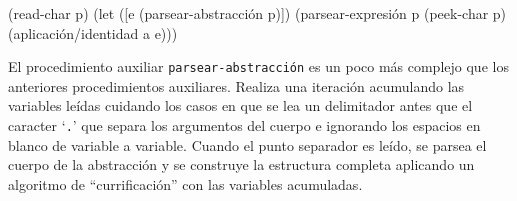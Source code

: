 \documentclass[10pt,oneside,openany,letterpaper]{book}
\begin{document}
\nwenddocs{}\endmoddef
(read-char p)
(let ([e (parsear-abstracción p)])
  (parsear-expresión p (peek-char p) (aplicación/identidad a e)))
\nwendcode{}\nwdocspar

El procedimiento auxiliar {\tt{}\protect{}parsear-\protect{}abstracción\protect{}} es un poco más complejo que los anteriores procedimientos auxiliares. Realiza una iteración acumulando las variables leídas cuidando los casos en que se lea un delimitador antes que el caracter `{\tt{}.}' que separa los argumentos del cuerpo e ignorando los espacios en blanco de variable a variable. Cuando el punto separador es leído, se parsea el cuerpo de la abstracción y se construye la estructura completa aplicando un algoritmo de ``currificación'' con las variables acumuladas.
\end{document}
